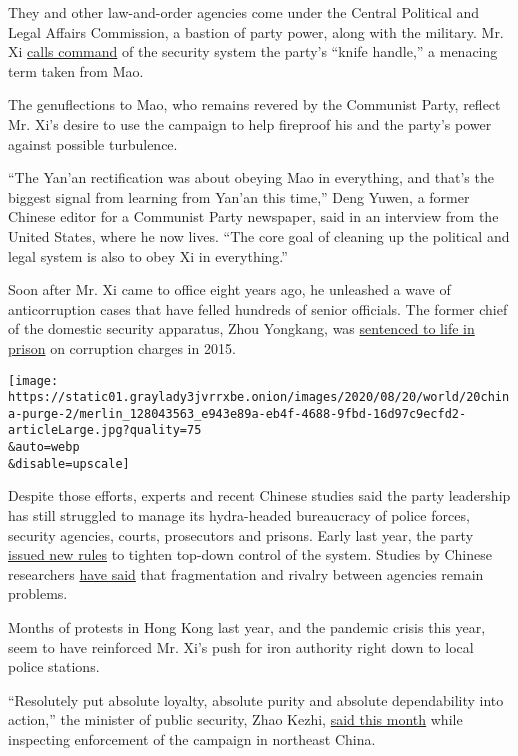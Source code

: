 They and other law-and-order agencies come under the Central Political
and Legal Affairs Commission, a bastion of party power, along with the
military. Mr. Xi
\href{https://chinadigitaltimes.net/2015/02/xis-sharp-words-ominous-legal-reform/}{calls
command} of the security system the party's ``knife handle,'' a menacing
term taken from Mao.

The genuflections to Mao, who remains revered by the Communist Party,
reflect Mr. Xi's desire to use the campaign to help fireproof his and
the party's power against possible turbulence.

``The Yan'an rectification was about obeying Mao in everything, and
that's the biggest signal from learning from Yan'an this time,'' Deng
Yuwen, a former Chinese editor for a Communist Party newspaper, said in
an interview from the United States, where he now lives. ``The core goal
of cleaning up the political and legal system is also to obey Xi in
everything.''

Soon after Mr. Xi came to office eight years ago, he unleashed a wave of
anticorruption cases that have felled hundreds of senior officials. The
former chief of the domestic security apparatus, Zhou Yongkang, was
\href{https://www.nytimes3xbfgragh.onion/2015/06/12/world/asia/zhou-yongkang-former-security-chief-in-china-gets-life-sentence-for-corruption.html}{sentenced
to life in prison} on corruption charges in 2015.

\texttt{[image: https://static01.graylady3jvrrxbe.onion/images/2020/08/20/world/20china-purge-2/merlin\_128043563\_e943e89a-eb4f-4688-9fbd-16d97c9ecfd2-articleLarge.jpg?quality=75\\\&auto=webp\\\&disable=upscale]}

Despite those efforts, experts and recent Chinese studies said the party
leadership has still struggled to manage its hydra-headed bureaucracy of
police forces, security agencies, courts, prosecutors and prisons. Early
last year, the party
\href{http://www.gov.cn/zhengce/2019-01/18/content_5359135.htm}{issued
new rules} to tighten top-down control of the system. Studies by Chinese
researchers
\href{http://www.cssn.cn/fx/202007/t20200721_5158007.shtml}{have said}
that fragmentation and rivalry between agencies remain problems.

Months of protests in Hong Kong last year, and the pandemic crisis this
year, seem to have reinforced Mr. Xi's push for iron authority right
down to local police stations.

``Resolutely put absolute loyalty, absolute purity and absolute
dependability into action,'' the minister of public security, Zhao
Kezhi,
\href{http://www.gov.cn/xinwen/2020-08/09/content_5533406.htm}{said this
month} while inspecting enforcement of the campaign in northeast China.

